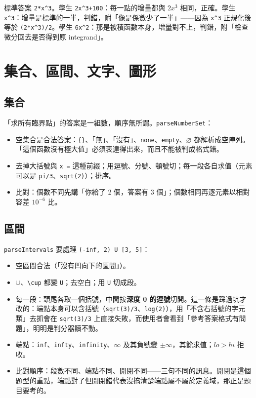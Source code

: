 \documentclass[11pt,a4paper,oneside]{book}
\renewcommand{\_}{\ifmmode\origunderscore\else\textunderscore\allowbreak\fi}
\newcommand{\code}[1]{\texttt{#1}}
\begin{document}
\begin{example}[$\int 6x^2\,dx$]
標準答案 \code{2*x\string^3}。學生 \code{2x\string^3+100}：每一點的增量都與 $2x^3$ 相同，正確。學生 \code{x\string^3}：增量是標準的一半，判錯，附「像是係數少了一半」——因為 \code{x\string^3} 正規化後等於 \code{(2*x\string^3)/2}。學生 \code{6x\string^2}：那是被積函數本身，增量對不上，判錯，附「檢查微分回去是否得到原 integrand」。
\end{example}

\chapter{集合、區間、文字、圖形}
\section{集合}
「求所有臨界點」的答案是一組數，順序無所謂。\code{parseNumberSet}：
\begin{itemize}
  \item 空集合是合法答案：\code{\{\}}、「無」、「沒有」、\code{none}、\code{empty}、$\varnothing$ 都解析成空陣列。「這個函數沒有極大值」必須表達得出來，而且不能被判成格式錯。
  \item 去掉大括號與 \code{x =} 這種前綴；用逗號、分號、頓號切；每一段各自求值（元素可以是 \code{pi/3}、\code{sqrt(2)}）；排序。
  \item 比對：個數不同先講「你給了 2 個，答案有 3 個」；個數相同再逐元素以相對容差 $10^{-6}$ 比。
\end{itemize}

\section{區間}
\code{parseIntervals} 要處理 \code{(-inf, 2) U [3, 5]}：
\begin{itemize}
  \item 空區間合法（「沒有凹向下的區間」）。
  \item $\cup$、\code{\textbackslash cup} 都變 \code{U}；去空白；用 \code{U} 切成段。
  \item 每一段：頭尾各取一個括號，中間按\textbf{深度 0 的逗號}切開。這一條是踩過坑才改的：端點本身可以含括號（\code{sqrt(3)/3}、\code{log(2)}），用「不含右括號的字元類」去抓會在 \code{sqrt(3)/3} 上直接失敗，而使用者會看到「參考答案格式有問題」，明明是判分器讀不動。
  \item 端點：\code{inf}、\code{infty}、\code{infinity}、$\infty$ 及其負號變 $\pm\infty$，其餘求值；$lo > hi$ 拒收。
  \item 比對順序：段數不同、端點不同、開閉不同——三句不同的訊息。開閉是這個題型的重點，端點對了但開閉錯代表沒搞清楚端點屬不屬於定義域，那正是題目要考的。
\end{itemize}
\end{document}
